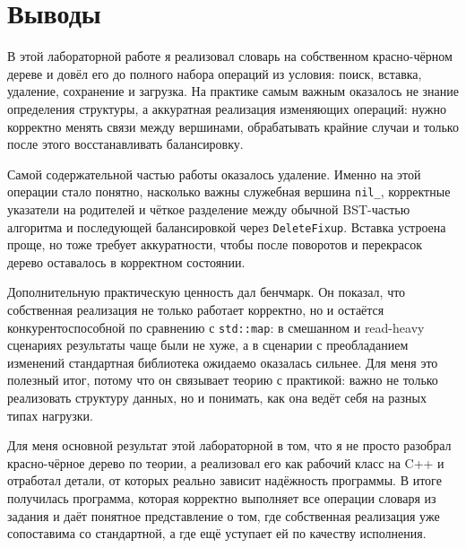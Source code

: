 \section{Выводы}

В этой лабораторной работе я реализовал словарь на собственном красно-чёрном дереве и довёл его до полного набора операций из условия: поиск, вставка, удаление, сохранение и загрузка. На практике самым важным оказалось не знание определения структуры, а аккуратная реализация изменяющих операций: нужно корректно менять связи между вершинами, обрабатывать крайние случаи и только после этого восстанавливать балансировку.

Самой содержательной частью работы оказалось удаление. Именно на этой операции стало понятно, насколько важны служебная вершина \texttt{nil\_}, корректные указатели на родителей и чёткое разделение между обычной BST-частью алгоритма и последующей балансировкой через \texttt{DeleteFixup}. Вставка устроена проще, но тоже требует аккуратности, чтобы после поворотов и перекрасок дерево оставалось в корректном состоянии.

Дополнительную практическую ценность дал бенчмарк. Он показал, что собственная реализация не только работает корректно, но и остаётся конкурентоспособной по сравнению с \texttt{std::map}: в смешанном и read-heavy сценариях результаты чаще были не хуже, а в сценарии с преобладанием изменений стандартная библиотека ожидаемо оказалась сильнее. Для меня это полезный итог, потому что он связывает теорию с практикой: важно не только реализовать структуру данных, но и понимать, как она ведёт себя на разных типах нагрузки.

Для меня основной результат этой лабораторной в том, что я не просто разобрал красно-чёрное дерево по теории, а реализовал его как рабочий класс на C++ и отработал детали, от которых реально зависит надёжность программы. В итоге получилась программа, которая корректно выполняет все операции словаря из задания и даёт понятное представление о том, где собственная реализация уже сопоставима со стандартной, а где ещё уступает ей по качеству исполнения.
\pagebreak
